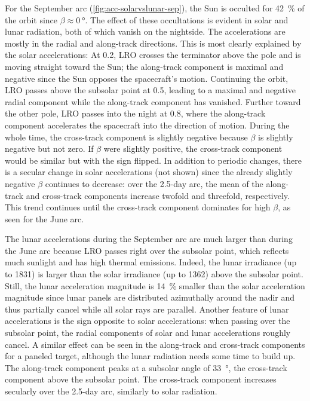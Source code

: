 For the September arc (\cref{fig:acc-solarvslunar-sep}), the Sun is occulted for \qty{42}{\percent} of the orbit since $\beta \approx \qty{0}{\degree}$. The effect of these occultations is evident in solar and lunar radiation, both of which vanish on the nightside. The accelerations are mostly in the radial and along-track directions. This is most clearly explained by the solar accelerations: At 0.2, \gls{LRO} crosses the terminator above the pole and is moving straight toward the Sun; the along-track component is maximal and negative since the Sun opposes the spacecraft's motion. Continuing the orbit, \gls{LRO} passes above the subsolar point at 0.5, leading to a maximal and negative radial component while the along-track component has vanished. Further toward the other pole, \gls{LRO} passes into the night at 0.8, where the along-track component accelerates the spacecraft into the direction of motion. During the whole time, the cross-track component is slightly negative because $\beta$ is slightly negative but not zero. If $\beta$ were slightly positive, the cross-track component would be similar but with the sign flipped. In addition to periodic changes, there is a secular change in solar accelerations (not shown) since the already slightly negative $\beta$ continues to decrease: over the 2.5-day arc, the mean of the along-track and cross-track components increase twofold and threefold, respectively. This trend continues until the cross-track component dominates for high $\beta$, as seen for the June arc.

The lunar accelerations during the September arc are much larger than during the June arc because \gls{LRO} passes right over the subsolar point, which reflects much sunlight and has high thermal emissions. Indeed, the lunar irradiance (up to \qty{1831}{\irr}) is larger than the solar irradiance (up to \qty{1362}{\irr}) above the subsolar point. Still, the lunar acceleration magnitude is \qty{14}{\percent} smaller than the solar acceleration magnitude since lunar panels are distributed azimuthally around the nadir and thus partially cancel while all solar rays are parallel. Another feature of lunar accelerations is the sign opposite to solar accelerations: when passing over the subsolar point, the radial components of solar and lunar accelerations roughly cancel. A similar effect can be seen in the along-track and cross-track components for a paneled target, although the lunar radiation needs some time to build up. The along-track component peaks at a subsolar angle of \qty{33}{\degree}, the cross-track component above the subsolar point. The cross-track component increases secularly over the 2.5-day arc, similarly to solar radiation.

